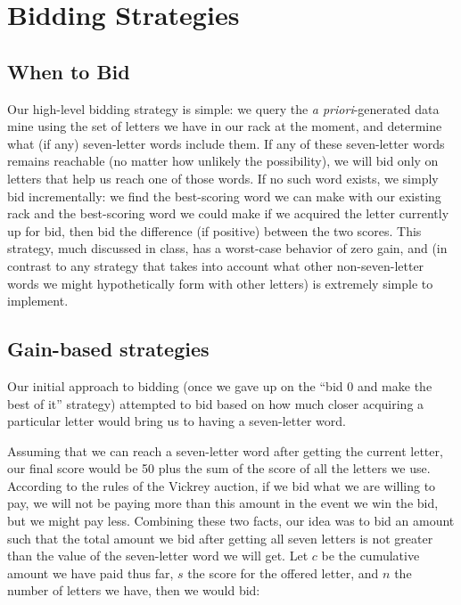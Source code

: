 \documentclass[11pt]{article}
\begin{document}
\section{Bidding Strategies}

\subsection{When to Bid}

Our high-level bidding strategy is simple: we query the {\it a priori}-generated data mine using the set of letters we have in our rack at the moment, and determine what (if any) seven-letter words include them.  If any of these seven-letter words remains reachable (no matter how unlikely the possibility), we will bid only on letters that help us reach one of those words.
If no such word exists, we simply bid incrementally: we find the best-scoring word we can make with our existing rack and the best-scoring word we could make if we acquired the letter currently up for bid, then bid the difference (if positive) between the two scores.  This strategy, much discussed in class, has a worst-case behavior of zero gain, and (in contrast to any strategy that takes into account what other non-seven-letter words we might hypothetically form with other letters) is extremely simple to implement.

\subsection{Gain-based strategies}

Our initial approach to bidding (once we gave up on the ``bid 0 and make the best of it'' strategy) attempted to bid based on how much closer acquiring a particular letter would bring us to having a seven-letter word.  

Assuming that we can reach a seven-letter word after getting the current letter, our final score would be 50 plus the sum of the score of all the letters we use. According to the rules of the Vickrey auction, if we bid what we are willing to pay, we will not be paying more than this amount in the event we win the bid, but we might pay less. Combining these two facts, our idea was to bid an amount such that the total amount we bid after getting all seven letters is not greater than the value of the seven-letter word we will get. Let $c$ be the cumulative amount we have paid thus far, $s$ the score for the offered letter, and $n$ the number of letters we have, then we would bid:
\end{document}
